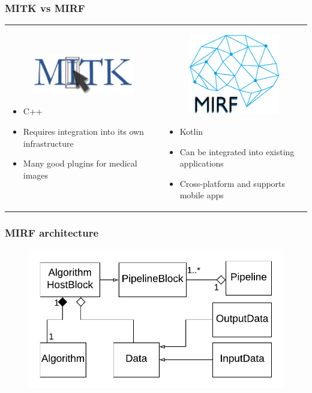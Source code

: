 \documentclass[xetex,mathserif,serif]{beamer}
\begin{document}
 \begin{frame}
     \frametitle{MITK vs MIRF}
     \begin{tabular}{p{5cm} p{6cm}}
        \begin{figure}[b]
             \centering
             \includegraphics[width=4.5cm]{pictures/mitk.png}  
         \end{figure}
         \begin{itemize}
             \item C++
             \item Requires integration into its own infrastructure
             \item Many good plugins  for medical images
         \end{itemize}
         &
         \begin{figure}[b]
             \centering
             \includegraphics[width=4.0cm]{pictures/mirf.png}  
         \end{figure}
         \begin{itemize}
             \item Kotlin
             \item Can be integrated into existing applications
             \item Cross-platform and supports mobile apps
         \end{itemize}
     \end{tabular}
 \end{frame}
 
\begin{frame}
     \frametitle{MIRF architecture}
        \begin{figure}[b]
             \centering
             \includegraphics[width=12cm]{pictures/pipe.png}
         \end{figure}
\end{frame}
 
\end{document}
